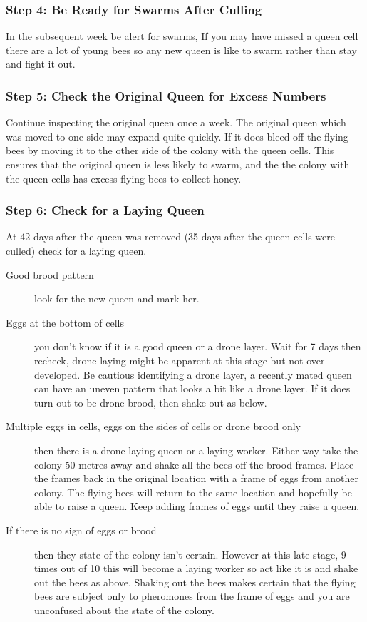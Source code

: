 \subsubsection*{Step 4: Be Ready for Swarms After Culling}

In the subsequent week be alert for swarms,
If you may have missed a queen cell there are a lot of young bees
so any new queen is like to swarm rather than stay and fight it out.

\subsubsection*{Step 5: Check the Original Queen for Excess Numbers}

Continue inspecting the original queen once a week.
The original queen which was moved to one side may expand quite quickly.
If it does bleed off the flying bees by moving it to the other side of the colony with the queen cells.
This ensures that the original queen is less likely to swarm,
and the the colony with the queen cells has excess flying bees to collect honey.

\subsubsection*{Step 6: Check for a Laying Queen}

At 42 days after the queen was removed
(35 days after the queen cells were culled)
check for a laying queen.

\begin{description}
  \item [Good brood pattern] look for the new queen and mark her.
  \item [Eggs at the bottom of cells] you don't know if it is a good queen or a drone layer.
    Wait for 7 days then recheck, drone laying might be apparent at this stage but not over developed.
    Be cautious identifying a drone layer, 
    a recently mated queen can have an uneven pattern that looks a bit like a drone layer.
    If it does turn out to be drone brood, then shake out as below.
  \item[Multiple eggs in cells, eggs on the sides of cells or drone brood only]
    then there is a drone laying queen or a laying worker.
    Either way take the colony 50 metres away and shake all the bees off the brood frames.
    Place the frames back in the original location with a frame of eggs from another colony.
    The flying bees will return to the same location and hopefully be able to raise a queen.
    Keep adding frames of eggs until they raise a queen.
  \item [If there is no sign of eggs or brood] then they state of the colony isn't certain.
    However at this late stage, 9 times out of 10 this will become a laying worker
    so act like it is and shake out the bees as above.
    Shaking out the bees makes certain that the flying bees are subject only to pheromones from the frame of eggs
    and you are unconfused about the state of the colony.
\end{description}

